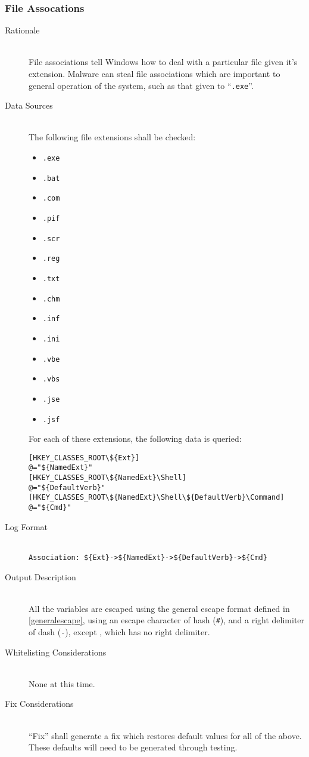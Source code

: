 \subsubsection{File Assocations}
\begin{description}
\item[Rationale] \hfill \\
File associations tell Windows how to deal with a particular file given it's
extension. Malware can steal file associations which are important to general
operation of the system, such as that given to ``\verb|.exe|''.
\item[Data Sources] \hfill \\
The following file extensions shall be checked:
\begin{itemize}
    \item \verb|.exe|
    \item \verb|.bat|
    \item \verb|.com|
    \item \verb|.pif|
    \item \verb|.scr|
    \item \verb|.reg|
    \item \verb|.txt|
    \item \verb|.chm|
    \item \verb|.inf|
    \item \verb|.ini|
    \item \verb|.vbe|
    \item \verb|.vbs|
    \item \verb|.jse|
    \item \verb|.jsf|
\end{itemize}

For each of these extensions, the following data is queried:

\vspace{-\baselineskip}
\begin{verbatim}
[HKEY_CLASSES_ROOT\${Ext}]
@="${NamedExt}"
[HKEY_CLASSES_ROOT\${NamedExt}\Shell]
@="${DefaultVerb}"
[HKEY_CLASSES_ROOT\${NamedExt}\Shell\${DefaultVerb}\Command]
@="${Cmd}"
\end{verbatim}
\item[Log Format] \hfill \\
\verb|Association: ${Ext}->${NamedExt}->${DefaultVerb}->${Cmd}|
\item[Output Description] \hfill \\
All the variables are escaped using the general escape format defined in
\ref{generalescape}, using an escape character of hash (\verb|#|), and a right
delimiter of dash (\verb|-|), except , which has no right delimiter.
\item[Whitelisting Considerations] \hfill \\
None at this time.
\item[Fix Considerations] \hfill \\
``Fix'' shall generate a fix which restores default values for all of the above.
These defaults will need to be generated through testing.
\end{description}

